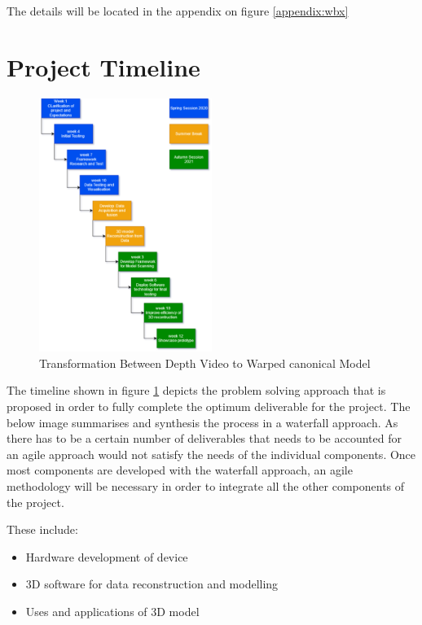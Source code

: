 \documentclass[12pt]{report}
\begin{document}
The details will be located in the appendix on figure \ref{appendix:wbx}
 
\section{Project Timeline}
\begin{figure} %
  \centering
  \includegraphics[width=0.5\textwidth]{timeline.png}
  \caption{Transformation Between Depth Video to Warped canonical Model}
  \label{Fig::timeline}
\end{figure}

The timeline shown in figure \ref{Fig::timeline} depicts the problem solving approach that is proposed in order to fully complete the optimum deliverable for the project. 
The below image summarises and synthesis the process in a waterfall approach. As there has to be a certain number of deliverables that needs to be accounted for an agile approach would not satisfy the needs of the individual components. 
Once most components are developed with the waterfall approach, an agile methodology will be necessary in order to integrate all the other components of the project.

These include:
\begin{itemize}
  \item Hardware development of device
  \item 3D software for data reconstruction and modelling 
  \item Uses and applications of 3D model
\end{itemize}
\end{document}
